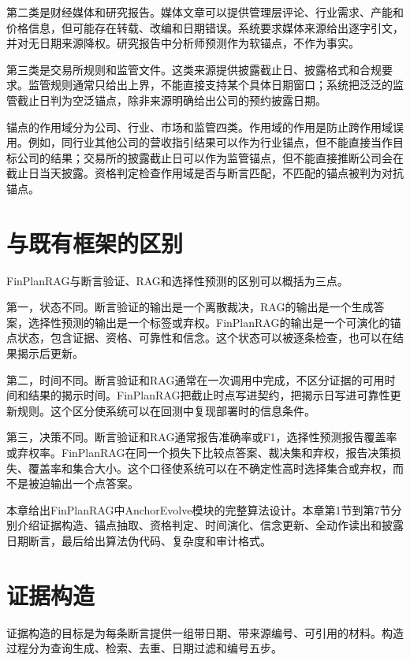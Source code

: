 第二类是财经媒体和研究报告。媒体文章可以提供管理层评论、行业需求、产能和价格信息，但可能存在转载、改编和日期错误。系统要求媒体来源给出逐字引文，并对无日期来源降权。研究报告中分析师预测作为软锚点，不作为事实。

第三类是交易所规则和监管文件。这类来源提供披露截止日、披露格式和合规要求。监管规则通常只给出上界，不能直接支持某个具体日期窗口；系统把泛泛的监管截止日判为空泛锚点，除非来源明确给出公司的预约披露日期。

锚点的作用域分为公司、行业、市场和监管四类。作用域的作用是防止跨作用域误用。例如，同行业其他公司的营收指引结果可以作为行业锚点，但不能直接当作目标公司的结果；交易所的披露截止日可以作为监管锚点，但不能直接推断公司会在截止日当天披露。资格判定检查作用域是否与断言匹配，不匹配的锚点被判为对抗锚点。

\section{与既有框架的区别}

FinPlanRAG与断言验证、RAG和选择性预测的区别可以概括为三点。

第一，状态不同。断言验证的输出是一个离散裁决，RAG的输出是一个生成答案，选择性预测的输出是一个标签或弃权。FinPlanRAG的输出是一个可演化的锚点状态，包含证据、资格、可靠性和信念。这个状态可以被逐条检查，也可以在结果揭示后更新。

第二，时间不同。断言验证和RAG通常在一次调用中完成，不区分证据的可用时间和结果的揭示时间。FinPlanRAG把截止时点写进契约，把揭示日写进可靠性更新规则。这个区分使系统可以在回测中复现部署时的信息条件。

第三，决策不同。断言验证和RAG通常报告准确率或F1，选择性预测报告覆盖率或弃权率。FinPlanRAG在同一个损失下比较点答案、裁决集和弃权，报告决策损失、覆盖率和集合大小。这个口径使系统可以在不确定性高时选择集合或弃权，而不是被迫输出一个点答案。


本章给出FinPlanRAG中AnchorEvolve模块的完整算法设计。本章第1节到第7节分别介绍证据构造、锚点抽取、资格判定、时间演化、信念更新、全动作读出和披露日期断言，最后给出算法伪代码、复杂度和审计格式。

\section{证据构造}

证据构造的目标是为每条断言提供一组带日期、带来源编号、可引用的材料。构造过程分为查询生成、检索、去重、日期过滤和编号五步。

